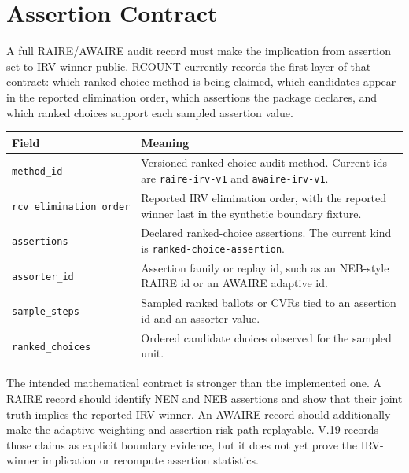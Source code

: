 \section{Assertion Contract}

A full RAIRE/AWAIRE audit record must make the implication from assertion set to
IRV winner public. RCOUNT currently records the first layer of that contract:
which ranked-choice method is being claimed, which candidates appear in the
reported elimination order, which assertions the package declares, and which
ranked choices support each sampled assertion value.

\begin{center}
\small
\begin{tabularx}{\textwidth}{lX}
\toprule
Field & Meaning \\
\midrule
\texttt{method\_id} & Versioned ranked-choice audit method. Current ids are \texttt{raire-irv-v1} and \texttt{awaire-irv-v1}. \\
\texttt{rcv\_elimination\_order} & Reported IRV elimination order, with the reported winner last in the synthetic boundary fixture. \\
\texttt{assertions} & Declared ranked-choice assertions. The current kind is \texttt{ranked-choice-assertion}. \\
\texttt{assorter\_id} & Assertion family or replay id, such as an NEB-style RAIRE id or an AWAIRE adaptive id. \\
\texttt{sample\_steps} & Sampled ranked ballots or CVRs tied to an assertion id and an assorter value. \\
\texttt{ranked\_choices} & Ordered candidate choices observed for the sampled unit. \\
\bottomrule
\end{tabularx}
\end{center}

The intended mathematical contract is stronger than the implemented one. A
RAIRE record should identify NEN and NEB assertions and show that their joint
truth implies the reported IRV winner. An AWAIRE record should additionally
make the adaptive weighting and assertion-risk path replayable. V.19 records
those claims as explicit boundary evidence, but it does not yet prove the
IRV-winner implication or recompute assertion statistics.
